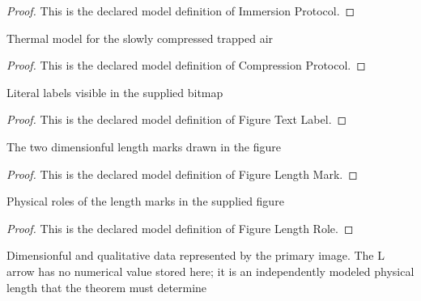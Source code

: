 \begin{proof}
  This is the declared model definition of Immersion Protocol.
\end{proof}
\begin{definition}
  \label{def:physics:phyx-mini-0364:phyxminiproblems-problemphyxmini0364-compressionprotocol}
  Thermal model for the slowly compressed trapped air
\end{definition}
\begin{proof}
  This is the declared model definition of Compression Protocol.
\end{proof}
\begin{definition}
  \label{def:physics:phyx-mini-0364:phyxminiproblems-problemphyxmini0364-figuretextlabel}
  Literal labels visible in the supplied bitmap
\end{definition}
\begin{proof}
  This is the declared model definition of Figure Text Label.
\end{proof}
\begin{definition}
  \label{def:physics:phyx-mini-0364:phyxminiproblems-problemphyxmini0364-figurelengthmark}
  The two dimensionful length marks drawn in the figure
\end{definition}
\begin{proof}
  This is the declared model definition of Figure Length Mark.
\end{proof}
\begin{definition}
  \label{def:physics:phyx-mini-0364:phyxminiproblems-problemphyxmini0364-figurelengthrole}
  Physical roles of the length marks in the supplied figure
\end{definition}
\begin{proof}
  This is the declared model definition of Figure Length Role.
\end{proof}
\begin{definition}
  \label{def:physics:phyx-mini-0364:phyxminiproblems-problemphyxmini0364-closedtoppipefigure}
  Dimensionful and qualitative data represented by the primary image. The L arrow has no numerical value stored here; it is an independently modeled physical length that the theorem must determine
\end{definition}
